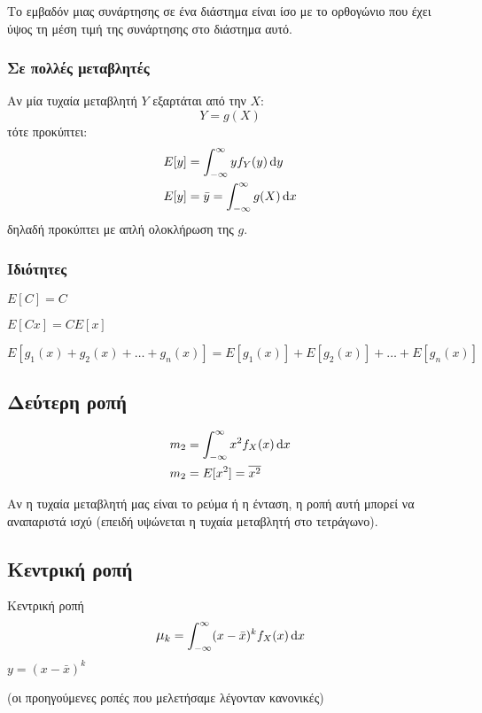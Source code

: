 \documentclass[11pt,a4paper,notitlepage,fleqn,final]{article}
\begin{document}
Το εμβαδόν μιας συνάρτησης σε ένα διάστημα είναι ίσο με το ορθογώνιο
που έχει ύψος τη μέση τιμή της συνάρτησης στο διάστημα αυτό.

\subsubsection{Σε πολλές μεταβλητές}
Αν μία τυχαία μεταβλητή \( Y \) εξαρτάται από την \( X \):
\[
Y = g(X)
\]
τότε προκύπτει:
\begin{align*}
E[y] &= \int_{-\infty}^{\infty} yf_Y(y)\mathop{}\!\mathrm{d} y \\
E[y] &= \bar y = \int_{-\infty}^{\infty} g(X)\mathop{}\!\mathrm{d} x
\end{align*}
δηλαδή προκύπτει με απλή ολοκλήρωση της \( g \).

\subsubsection{Ιδιότητες}
\begin{enumparen}
	\item \( E[C] = C \)
	\item \( E[Cx] = CE[x] \)
	\item \( E\left[g_1(x)+g_2(x)+\dots+g_n(x)\right]
	= E\left[g_1(x)\right] + E\left[g_2(x)\right] + \dots
	+ E\left[g_n(x)\right]
	\)
\end{enumparen}

\subsection{Δεύτερη ροπή}
\begin{align*}
	m_2 &= \int_{-\infty}^{\infty} x^2 f_X(x) \mathop{}\!\mathrm{d} x\\
	m_2 &= E[x^2] = \overline{x^2}
\end{align*}

Αν η τυχαία μεταβλητή μας είναι το ρεύμα ή η ένταση, η ροπή αυτή
μπορεί να αναπαριστά ισχύ (επειδή υψώνεται η τυχαία μεταβλητή
στο τετράγωνο).

\subsection{Κεντρική ροπή}
\begin{defn}{Κεντρική ροπή}{}
	\begin{align*}
	\mathlarger{\mu_k}
	 = \int_{-\infty}^{\infty} (x-\bar x)^k f_X(x)\dif x
	\end{align*}
	\( y=(x-\bar x)^k \)
\end{defn}
(οι προηγούμενες ροπές που μελετήσαμε λέγονταν κανονικές)
\end{document}
